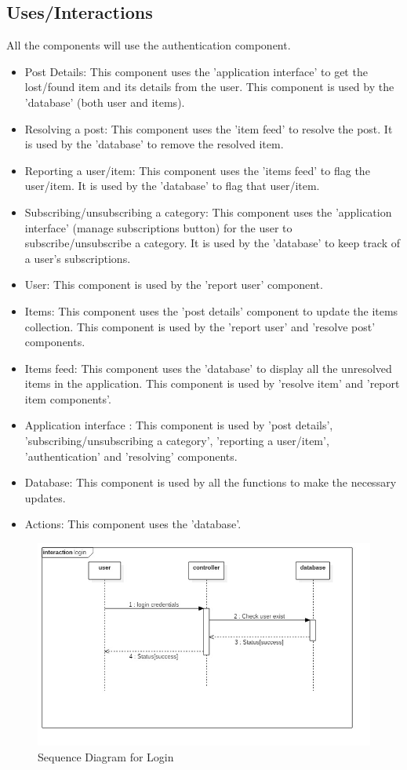 \documentclass[a4paper,12pt]{article}
\begin{document}
\subsection{Uses/Interactions}
All the components will use the authentication component.
\begin{itemize}
\item Post Details: This component uses the 'application interface' to get the lost/found item and its details from the user. This component is used by the 'database' (both user and items).    
\item Resolving a post: This component uses the 'item feed' to resolve the post. It is used by the 'database' to remove the resolved item. 
\item Reporting a user/item: This component uses the 'items feed' to flag the user/item. It is used by the 'database' to flag that user/item.  
\item Subscribing/unsubscribing a category: This component uses the 'application interface' (manage subscriptions button) for the user to subscribe/unsubscribe a category. It is used by the 'database' to keep track of a user's subscriptions. 
\item User: This component is used by the 'report user' component. 
\item Items: This component uses the 'post details' component to update the items collection. This component is used by the 'report user' and 'resolve post' components.  
\item Items feed: This component uses the 'database' to display all the unresolved items in the application. This component is used by 'resolve item' and 'report item components'. 
\item Application interface : This component is used by 'post details', 'subscribing/unsubscribing a category', 'reporting a user/item', 'authentication' and 'resolving' components.    
\item Database: This component is used by all the functions to make the necessary updates. 
\item Actions: This component uses the 'database'.
\end{itemize}
\begin{figure}[h!]
  \includegraphics[width=1\textwidth]{login}
  \caption{Sequence Diagram for Login}
\end{figure}
\end{document}
